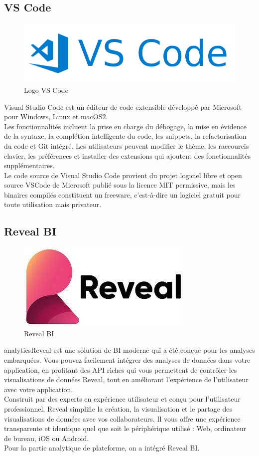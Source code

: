 \documentclass[a4paper, 12pt]{report}
\begin{document}
\subsection{VS Code}
\begin{figure}[H]
    \centering
    \includegraphics[width = 0.5\linewidth]{img/vscode.png}
    \caption{Logo VS Code}
\end{figure}
Visual Studio Code est un éditeur de code extensible développé par Microsoft pour Windows, Linux et macOS2.\\
Les fonctionnalités incluent la prise en charge du débogage, la mise en évidence de la syntaxe, la complétion intelligente du code, les snippets, la refactorisation du code et Git intégré. Les utilisateurs peuvent modifier le thème, les raccourcis clavier, les préférences et installer des extensions qui ajoutent des fonctionnalités supplémentaires.\\
Le code source de Visual Studio Code provient du projet logiciel libre et open source VSCode de Microsoft publié sous la licence MIT permissive, mais les binaires compilés constituent un freeware, c'est-à-dire un logiciel gratuit pour toute utilisation mais privateur.
\subsection{Reveal BI}
\begin{figure}[H]
    \centering
    \includegraphics[width = 0.5\linewidth]{img/reveal.jpeg}
    \caption{Reveal BI}
\end{figure}
analyticsReveal est une solution de BI moderne qui a été conçue pour les analyses embarquées. Vous pouvez facilement intégrer des analyses de données dans votre application, en profitant des API riches qui vous permettent de contrôler les visualisations de données Reveal, tout en améliorant l'expérience de l'utilisateur avec votre application.\\
Construit par des experts en expérience utilisateur et conçu pour l'utilisateur professionnel, Reveal simplifie la création, la visualisation et le partage des visualisations de données avec vos collaborateurs. Il vous offre une expérience transparente et identique quel que soit le périphérique utilisé : Web, ordinateur de bureau, iOS ou Android.\\
Pour la partie analytique de plateforme, on a intégré Reveal BI. 
\end{document}
